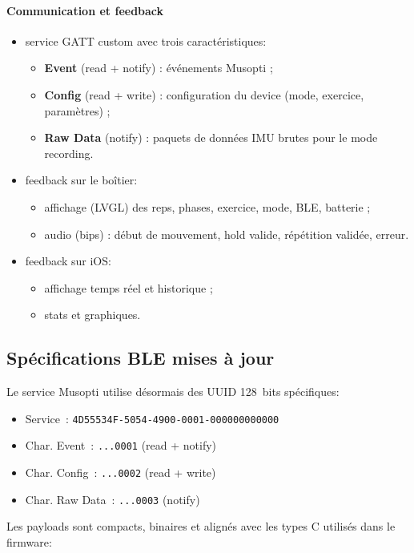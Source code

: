 \documentclass[a4paper,11pt]{article}
\begin{document}
\paragraph{Communication et feedback}
\begin{itemize}
  \item service GATT custom avec trois caractéristiques:
  \begin{itemize}
    \item \textbf{Event} (read + notify) : événements Musopti ;
    \item \textbf{Config} (read + write) : configuration du device (mode, exercice, paramètres) ;
    \item \textbf{Raw Data} (notify) : paquets de données IMU brutes pour le mode recording.
  \end{itemize}
  \item feedback sur le boîtier:
  \begin{itemize}
    \item affichage (LVGL) des reps, phases, exercice, mode, BLE, batterie ;
    \item audio (bips) : début de mouvement, hold valide, répétition validée, erreur.
  \end{itemize}
  \item feedback sur iOS:
  \begin{itemize}
    \item affichage temps réel et historique ;
    \item stats et graphiques.
  \end{itemize}
\end{itemize}

\subsection{Spécifications BLE mises à jour}

Le service Musopti utilise désormais des UUID 128~bits spécifiques:
\begin{itemize}
  \item Service~: \texttt{4D55534F-5054-4900-0001-000000000000}
  \item Char. Event~: \texttt{...0001} (read + notify)
  \item Char. Config~: \texttt{...0002} (read + write)
  \item Char. Raw Data~: \texttt{...0003} (notify)
\end{itemize}

Les payloads sont compacts, binaires et alignés avec les types C utilisés dans le firmware:
\end{document}
